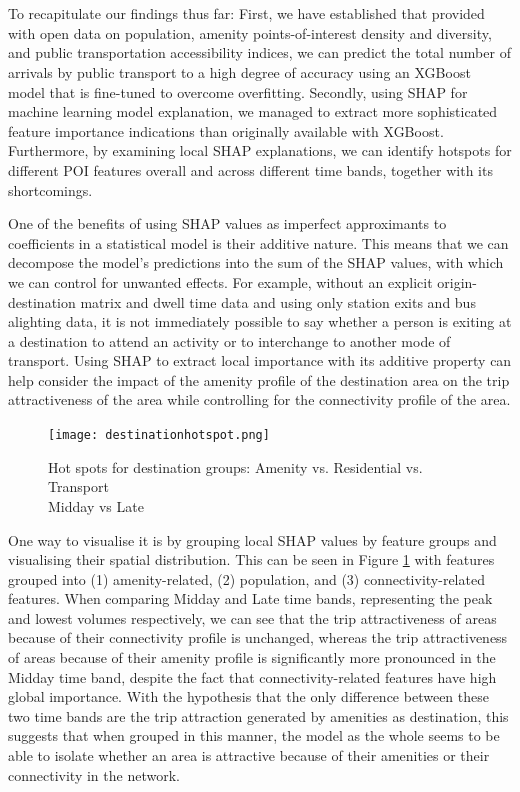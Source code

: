 \section*{}
To recapitulate our findings thus far: First, we have established that provided with open data on population, amenity points-of-interest density and diversity, and public transportation accessibility indices, we can predict the total number of arrivals by public transport to a high degree of accuracy using an XGBoost model that is fine-tuned to overcome overfitting. Secondly, using SHAP for machine learning model explanation, we managed to extract more sophisticated feature importance indications than originally available with XGBoost. Furthermore, by examining local SHAP explanations, we can identify hotspots for different POI features overall and across different time bands, together with its shortcomings. 

One of the benefits of using SHAP values as imperfect approximants to coefficients in a statistical model is their additive nature. This means that we can decompose the model's predictions into the sum of the SHAP values, with which we can control for unwanted effects. For example, without an explicit origin-destination matrix and dwell time data and using only station exits and bus alighting data, it is not immediately possible to say whether a person is exiting at a destination to attend an activity or to interchange to another mode of transport. Using SHAP to extract local importance with its additive property can help consider the impact of the amenity profile of the destination area on the trip attractiveness of the area while controlling for the connectivity profile of the area. 

\begin{figure}[!ht]
    \centering
    \texttt{[image: destinationhotspot.png]}
    \captionsetup{justification=centering}
    \caption{Hot spots for destination groups: Amenity vs. Residential vs. Transport\\ Midday vs Late}
    \label{fig:destinationhotspot}
\end{figure}

One way to visualise it is by grouping local SHAP values by feature groups and visualising their spatial distribution. This can be seen in Figure \ref{fig:destinationhotspot} with features grouped into (1) amenity-related, (2) population, and (3) connectivity-related features. When comparing Midday and Late time bands, representing the peak and lowest volumes respectively, we can see that the trip attractiveness of areas because of their connectivity profile is unchanged, whereas the trip attractiveness of areas because of their amenity profile is significantly more pronounced in the Midday time band, despite the fact that connectivity-related features have high global importance. With the hypothesis that the only difference between these two time bands are the trip attraction generated by amenities as destination, this suggests that when grouped in this manner, the model as the whole seems to be able to isolate whether an area is attractive because of their amenities or their connectivity in the network. 

